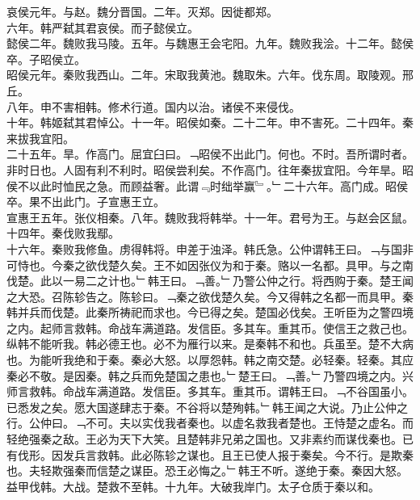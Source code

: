 \documentclass{zhvt-classic}
\begin{document}
\hspace*{2em}哀侯元年。与赵。魏分晋国。二年。灭郑。因徙都郑。\\
\hspace*{2em}六年。韩严弑其君哀侯。而子懿侯立。\\
\hspace*{2em}懿侯二年。魏败我马陵。五年。与魏惠王会宅阳。九年。魏败我浍。十二年。懿侯卒。子昭侯立。\\
\hspace*{2em}昭侯元年。秦败我西山。二年。宋取我黄池。魏取朱。六年。伐东周。取陵观。邢丘。\\
\hspace*{2em}八年。申不害相韩。修术行道。国内以治。诸侯不来侵伐。\\
\hspace*{2em}十年。韩姬弑其君悼公。十一年。昭侯如秦。二十二年。申不害死。二十四年。秦来拔我宜阳。\\
\hspace*{2em}二十五年。旱。作高门。屈宜臼曰。﹁昭侯不出此门。何也。不时。吾所谓时者。非时日也。人固有利不利时。昭侯尝利矣。不作高门。往年秦拔宜阳。今年旱。昭侯不以此时恤民之急。而顾益奢。此谓﹃时绌举赢﹄。﹂二十六年。高门成。昭侯卒。果不出此门。子宣惠王立。\\
\hspace*{2em}宣惠王五年。张仪相秦。八年。魏败我将韩举。十一年。君号为王。与赵会区鼠。十四年。秦伐败我鄢。\\
\hspace*{2em}十六年。秦败我修鱼。虏得韩将。申差于浊泽。韩氏急。公仲谓韩王曰。﹁与国非可恃也。今秦之欲伐楚久矣。王不如因张仪为和于秦。赂以一名都。具甲。与之南伐楚。此以一易二之计也。﹂韩王曰。﹁善。﹂乃警公仲之行。将西购于秦。楚王闻之大恐。召陈轸告之。陈轸曰。﹁秦之欲伐楚久矣。今又得韩之名都一而具甲。秦韩并兵而伐楚。此秦所祷祀而求也。今已得之矣。楚国必伐矣。王听臣为之警四境之内。起师言救韩。命战车满道路。发信臣。多其车。重其币。使信王之救己也。纵韩不能听我。韩必德王也。必不为雁行以来。是秦韩不和也。兵虽至。楚不大病也。为能听我绝和于秦。秦必大怒。以厚怨韩。韩之南交楚。必轻秦。轻秦。其应秦必不敬。是因秦。韩之兵而免楚国之患也。﹂楚王曰。﹁善。﹂乃警四境之内。兴师言救韩。命战车满道路。发信臣。多其车。重其币。谓韩王曰。﹁不谷国虽小。已悉发之矣。愿大国遂肆志于秦。不谷将以楚殉韩。﹂韩王闻之大说。乃止公仲之行。公仲曰。﹁不可。夫以实伐我者秦也。以虚名救我者楚也。王恃楚之虚名。而轻绝强秦之敌。王必为天下大笑。且楚韩非兄弟之国也。又非素约而谋伐秦也。已有伐形。因发兵言救韩。此必陈轸之谋也。且王已使人报于秦矣。今不行。是欺秦也。夫轻欺强秦而信楚之谋臣。恐王必悔之。﹂韩王不听。遂绝于秦。秦因大怒。益甲伐韩。大战。楚救不至韩。十九年。大破我岸门。太子仓质于秦以和。\\
\end{document}
